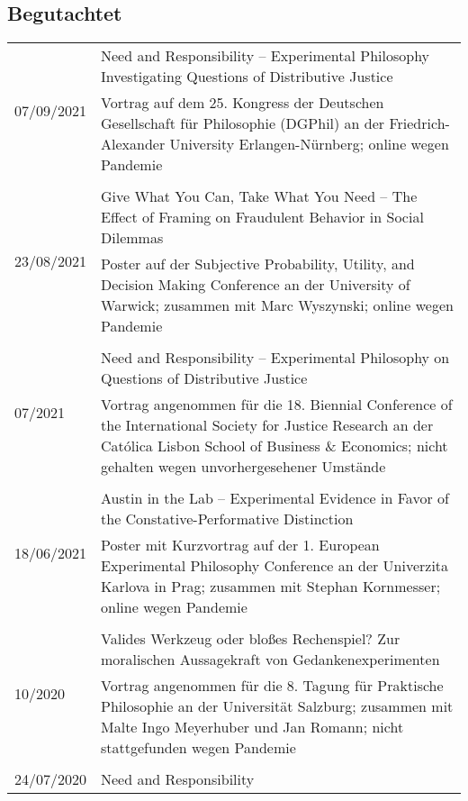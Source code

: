 \documentclass[a4paper,10pt]{article}
\begin{document}
\subsection*{Begutachtet}
\begin{longtable}{p{}p{}}
\multirow{2}{1,75cm}{\footnotesize{07/09/2021}} & Need and Responsibility -- Experimental Philosophy Investigating Questions of Distributive Justice\\
& \footnotesize{Vortrag auf dem 25. Kongress der Deutschen Gesellschaft für Philosophie (DGPhil) an der Friedrich-Alexander University Erlangen-Nürnberg; online wegen Pandemie}\\
\\
\multirow{2}{1,75cm}{\footnotesize{23/08/2021}} & Give What You Can, Take What You Need -- The Effect of Framing on Fraudulent Behavior in Social Dilemmas\\
& \footnotesize{Poster auf der Subjective Probability, Utility, and Decision Making Conference an der University of Warwick; zusammen mit Marc Wyszynski; online wegen Pandemie}\\
\\
\multirow{2}{1,75cm}{\footnotesize{07/2021}} & Need and Responsibility -- Experimental Philosophy on Questions of Distributive Justice\\
& \footnotesize{Vortrag angenommen für die 18. Biennial Conference of the International Society for Justice Research an der Católica Lisbon School of Business \& Economics; nicht gehalten wegen unvorhergesehener Umstände}\\
\\
\multirow{2}{1,75cm}{\footnotesize{18/06/2021}} & Austin in the Lab -- Experimental Evidence in Favor of the Constative-Performative Distinction\\
& \footnotesize{Poster mit Kurzvortrag auf der 1. European Experimental Philosophy Conference an der Univerzita Karlova in Prag; zusammen mit Stephan Kornmesser; online wegen Pandemie}\\
\\
\multirow{2}{1,75cm}{\footnotesize{10/2020}} & Valides Werkzeug oder bloßes Rechenspiel? Zur moralischen Aussagekraft von Gedankenexperimenten\\
& \footnotesize{Vortrag angenommen für die 8. Tagung für ​Praktische Philosophie an der Universität Salzburg; zusammen mit Malte Ingo Meyerhuber und Jan Romann; nicht stattgefunden wegen Pandemie}\\
\\
\multirow{2}{1,75cm}{\footnotesize{24/07/2020}} & Need and Responsibility\\

\end{longtable}
\end{document}
